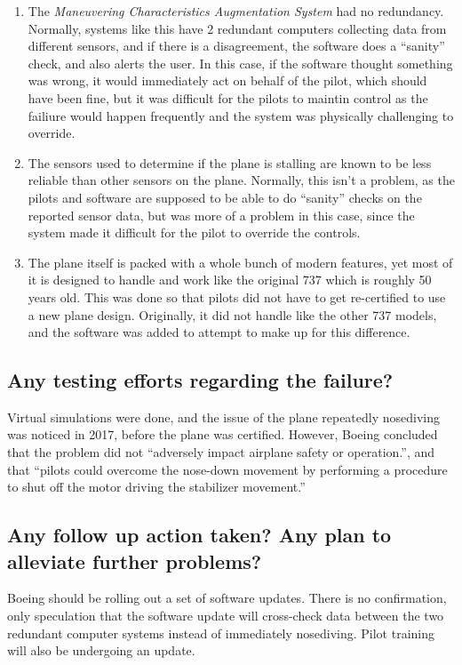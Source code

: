 \documentclass[letterpaper]{article}
\begin{document}
	\begin{enumerate}
		\item The \textit{Maneuvering Characteristics Augmentation System} had no redundancy.
			Normally, systems like this have 2 redundant computers collecting data from different sensors,
			and if there is a disagreement, the software does a ``sanity'' check, and also alerts the user.
			In this case, if the software thought something was wrong, it would immediately act on behalf of the pilot,
			which should have been fine, but it was difficult for the pilots to maintin control as the failiure would happen
			frequently and the system was physically challenging to override.\cite{verge}

		\item The sensors used to determine if the plane is stalling are known to be less reliable than other sensors on the plane.
			Normally, this isn't a problem, as the pilots and software are supposed to be able to do ``sanity'' checks 
			on the reported sensor data, but was more of a problem in this case, since the system made it difficult for the pilot to
			override the controls.\cite{ieeespectrum}

		\item The plane itself is packed with a whole bunch of modern features, yet most of it is designed to handle and work like the 
			original 737 which is roughly 50 years old. This was done so that pilots did not have to get re-certified to use a new plane design.
			Originally, it did not handle like the other 737 models, and the software was added to attempt to make up for this difference.\cite{verge}

	\end{enumerate}
	

	\subsection*{Any testing efforts regarding the failure?}

	Virtual simulations were done, and the issue of the plane repeatedly nosediving was noticed in 2017, before the plane was certified. 
	However, Boeing concluded that the problem did not ``adversely impact airplane safety or operation.'', and that 
	``pilots could overcome the nose-down movement by performing a procedure to shut off the motor driving the stabilizer movement.''\cite{bloomberg}\cite{goggin_2019}
	

	\subsection*{Any follow up action taken? Any plan to alleviate further problems?}
	Boeing should be rolling out a set of software updates\cite{ieeespectrum}\cite{bloomberg}.
	There is no confirmation, only speculation that the software update will cross-check data between the two redundant computer systems
	instead of immediately nosediving.\cite{ieeespectrum}
	Pilot training will also be undergoing an update.\cite{cnn}


\nocite{*}
\printbibliography
\end{document}
